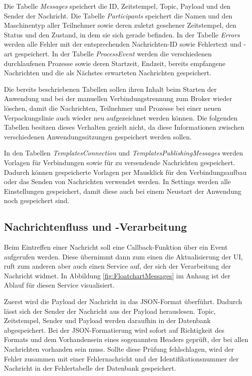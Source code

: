 Die Tabelle \textit{Messages} speichert die ID, Zeitstempel, Topic, Payload und den Sender der Nachricht. Die Tabelle \textit{Participants} speichert die Namen und den Maschinentyp aller Teilnehmer sowie deren zuletzt gesehener Zeitstempel, den Status und den Zustand, in dem sie sich gerade befinden.
In der Tabelle \textit{Errors} werden alle Fehler mit der entsprechenden Nachrichten-ID sowie Fehlertext und -art gespeichert.
In der Tabelle \textit{ProcessEvent} werden die verschiedenen durchlaufenen Prozesse sowie deren Startzeit, Endzeit, bereits empfangene Nachrichten und die als Nächstes erwarteten Nachrichten gespeichert.

Die bereits beschriebenen Tabellen sollen ihren Inhalt beim Starten der Anwendung und bei der manuellen Verbindungstrennung zum Broker wieder löschen, damit die Nachrichten, Teilnehmer und Prozesse bei einer neuen Verpackungslinie auch wieder neu aufgezeichnet werden können. Die folgenden Tabellen besitzen dieses Verhalten gezielt nicht, da diese Informationen zwischen verschiedenen Anwendungssitzungen gespeichert werden sollen.

In den Tabellen \textit{TemplatesConnection} und \textit{TemplatesPublishingMessages} werden Vorlagen für Verbindungen sowie für zu versendende Nachrichten gespeichert. Dadurch können gespeicherte Vorlagen per Mausklick für den Verbindungsaufbau oder das Senden von Nachrichten verwendet werden.
In Settings werden alle Einstellungen gespeichert, damit diese auch bei einem Neustart der Anwendung noch gespeichert sind.

\subsection{Nachrichtenfluss und -Verarbeitung}
Beim Eintreffen einer Nachricht soll eine Callback-Funktion über ein Event aufgerufen werden. Diese übernimmt dann zum einen die Aktualisierung der UI, ruft zum anderen aber auch einen Service auf, der sich der Verarbeitung der Nachricht widmet. 
In Abbildung \ref{fig:FloatchartMessages} im Anhang ist der Ablauf für diesen Service visualisiert.

Zuerst wird die Payload der Nachricht in das JSON-Format überführt. Dadurch lässt sich der Sender der Nachricht aus der Payload herauslesen. Topic, Zeitstempel, Sender und Payload werden daraufhin in der Datenbank abgespeichert. Bei der JSON-Formatierung wird sofort auf Richtigkeit des Formats und dem Vorhandensein eines sogenannten Headers geprüft, der bei allen Nachrichten vorhanden sein muss.
Sollte diese Prüfung fehlschlagen, wird der Fehler zusammen mit einer Fehlernachricht und der Identifikationsnummer der Nachricht in der Fehlertabelle der Datenbank gespeichert.

